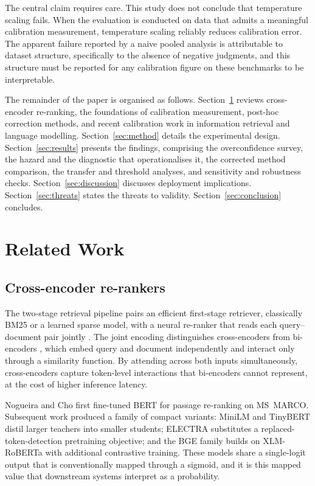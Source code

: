 \documentclass[sn-mathphys-num,pdflatex]{sn-jnl}
\begin{document}
The central claim requires care. This study does not conclude that temperature
scaling fails. When the evaluation is conducted on data that admits a meaningful
calibration measurement, temperature scaling reliably reduces calibration error.
The apparent failure reported by a naive pooled analysis is attributable to
dataset structure, specifically to the absence of negative judgments, and this
structure must be reported for any calibration figure on these benchmarks to be
interpretable.

The remainder of the paper is organised as follows.
Section~\ref{sec:related} reviews cross-encoder re-ranking, the foundations of
calibration measurement, post-hoc correction methods, and recent calibration
work in information retrieval and language modelling.
Section~\ref{sec:method} details the experimental design.
Section~\ref{sec:results} presents the findings, comprising the overconfidence
survey, the hazard and the diagnostic that operationalises it, the corrected method
comparison, the transfer and threshold analyses, and sensitivity and robustness
checks.
Section~\ref{sec:discussion} discusses deployment implications.
Section~\ref{sec:threats} states the threats to validity.
Section~\ref{sec:conclusion} concludes.

\section{Related Work}\label{sec:related}

\subsection{Cross-encoder re-rankers}\label{sec:rw-ce}
The two-stage retrieval pipeline pairs an efficient first-stage retriever,
classically BM25 \cite{robertson2009bm25} or a learned sparse model, with a
neural re-ranker that reads each query--document pair jointly
\cite{nogueira2019}. The joint encoding distinguishes cross-encoders from
bi-encoders \cite{reimers2019sbert}, which embed query and document independently
and interact only through a similarity function. By attending across both inputs
simultaneously, cross-encoders capture token-level interactions that bi-encoders
cannot represent, at the cost of higher inference latency.

Nogueira and Cho \cite{nogueira2019} first fine-tuned BERT for passage
re-ranking on MS~MARCO. Subsequent work produced a family of compact variants:
MiniLM \cite{wang2020minilm} and TinyBERT \cite{jiao2020tinybert} distil larger
teachers into smaller students; ELECTRA \cite{clark2020electra} substitutes a
replaced-token-detection pretraining objective; and the BGE family
\cite{xiao2023bge} builds on XLM-RoBERTa with additional contrastive training.
These models share a single-logit output that is conventionally mapped through a
sigmoid, and it is this mapped value that downstream systems interpret as a
probability.
\end{document}
